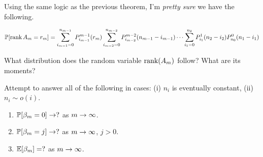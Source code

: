 Using the same logic as the previous theorem, I'm {\em pretty sure} we have
the following.

\begin{conjecture}
  \[
    \mathbb{P}[\operatorname{\mathrm{rank}} A_m = r_m] = \sum_{i_{m-1}=0}^{n_{m-1}} P^{m-1}_{i_{m-1}}(r_m)
    \sum_{i_{m-2} = 0}^{n_{m-2}} P^{m-2}_{i_{m-2}}(n_{m-1}- i_{m-1})
    \cdots \sum_{i_1 = 0}^{n_2}P^1_{i_1}(n_2-i_2) P^0_{n_0}(n_1-i_1)
  \]
\end{conjecture}


\begin{question} What distribution does the random variable
  $\operatorname{\mathrm{rank}}(A_m)$ follow? What are its moments?
\end{question}

\begin{conjecture}
  Attempt to answer all of the following in cases:
  (i) $n_i$ is eventually constant, (ii) $n_i \sim o(i)$.
  \begin{enumerate}
    \item $\mathbb{P}[\beta_m = 0] \rightarrow ?$ as $m \rightarrow \infty$.
    \item $\mathbb{P}[\beta_m = j] \rightarrow ?$ as $m \rightarrow \infty$, $j>0$.
    \item $\mathbb{E}[\beta_m] = ?$ as $m \rightarrow \infty$.
  \end{enumerate}
\end{conjecture}

